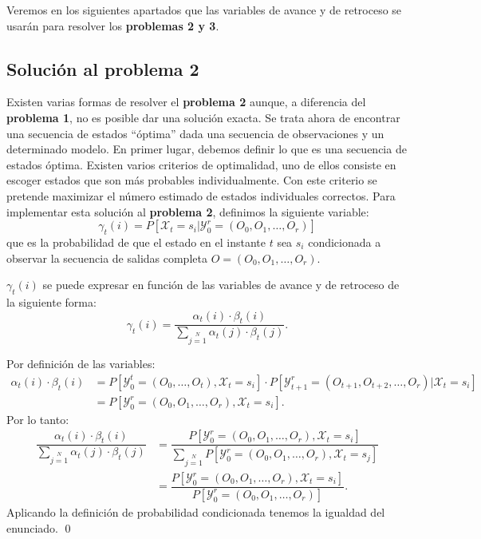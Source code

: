Veremos en los siguientes apartados que las variables de avance y de retroceso se usarán para resolver los \textbf{problemas 2 y 3}.

\subsection{Solución al problema 2}
Existen varias formas de resolver el \textbf{problema 2} aunque, a diferencia del \textbf{problema 1}, no es posible dar una solución exacta. Se trata ahora de encontrar una secuencia de estados \enquote{óptima} dada una secuencia de observaciones y un determinado modelo. En primer lugar, debemos definir lo que es una secuencia de estados óptima. Existen varios criterios de optimalidad, uno de ellos consiste en escoger estados que son más probables individualmente. Con este criterio se pretende maximizar el número estimado de estados individuales correctos. Para implementar esta solución al \textbf{problema 2}, definimos la siguiente variable: 
\[\gamma_t(i)=P[\mathcal{X}_t=s_i|\mathcal{Y}_0^r=(O_0,O_1,\dots, O_r)]\]
que es la probabilidad de que el estado en el instante $t$ sea $s_i$ condicionada a observar la secuencia de salidas completa $O=(O_0,O_1,\dots, O_r)$.

\begin{proposition}
$\gamma_t(i)$ se puede expresar en función de las variables de avance y de retroceso de la siguiente forma:
\[\gamma_t(i)=\dfrac{\alpha_t(i)\cdot\beta_t(i)}{\sum\limits_{j=1}\limits^N \alpha_t(j)\cdot\beta_t(j)}.\]
\end{proposition}
\begin{proofs*}
Por definición de las variables:
\[
\begin{aligned}
    \alpha_t(i)\cdot\beta_t(i)&=P[\mathcal{Y}_0^t=(O_0,\dots,O_t), \mathcal{X}_t=s_i]\cdot P[\mathcal{Y}_{t+1}^r=(O_{t+1},O_{t+2},\dots,O_{r})|\mathcal{X}_t=s_i]\\
    &=P[\mathcal{Y}_0^r=(O_0,O_1,\dots, O_r),\mathcal{X}_t=s_i].
\end{aligned}
\]
Por lo tanto:
\[
\begin{aligned}
    \dfrac{\alpha_t(i)\cdot\beta_t(i)}{\sum\limits_{j=1}\limits^N \alpha_t(j)\cdot\beta_t(j)}&=\dfrac{P[\mathcal{Y}_0^r=(O_0,O_1,\dots, O_r),\mathcal{X}_t=s_i]}{\sum\limits_{j=1}\limits^N P[\mathcal{Y}_0^r=(O_0,O_1,\dots, O_r),\mathcal{X}_t=s_j]}\\
    &=\dfrac{P[\mathcal{Y}_0^r=(O_0,O_1,\dots, O_r),\mathcal{X}_t=s_i]}{P[\mathcal{Y}_0^r=(O_0,O_1,\dots, O_r)]}.
\end{aligned}
\]
Aplicando la definición de probabilidad condicionada tenemos la igualdad del enunciado. \qed 
\end{proofs*}

